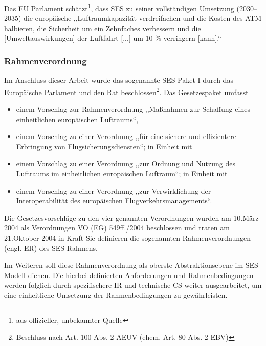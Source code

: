     \medskip
    Das \acs{EU} Parlament schätzt\footnote{aus offizieller, unbekannter Quelle}, dass \ac{SES} zu seiner vollständigen Umsetzung (2030--2035) die europäische ,,Luftraumkapazität verdreifachen und die Kosten des \ac{ATM} halbieren, die Sicherheit um ein Zehnfaches verbessern und die [Umweltauswirkungen] der Luftfahrt [...] um 10 \% verringern [kann].`` 
    \cite{eu_parl_ses} 


\subsubsection{Rahmenverordnung}

    Im Anschluss dieser Arbeit wurde das sogenannte \acs{SES}-Paket I durch das Europäische Parlament und den Rat beschlossen\footnote{Beschluss nach Art. 100 Abs. 2 AEUV (ehem. Art. 80 Abs. 2 EBV)}.
    Das Gesetzespaket umfasst 
    
    \begin{itemize}
        \item einem Vorschlag zur Rahmenverordnung ,,Maßnahmen zur Schaffung eines einheitlichen europäischen Luftraums``\cite{kom_01_564, kom_01_123},
        \item einem Vorschlag zu einer Verordnung ,,für eine sichere und effizientere Erbringung von Flugsicherungsdiensten``\cite{kom_01_564_1}; in Einheit mit
        \item  einem Vorschlag zu einer Verordnung ,,zur Ordnung und Nutzung des Luftraums im einheitlichen europäischen Luftraum``\cite{kom_01_564_2}; in Einheit mit
        \item  einem Vorschlag zu einer Verordnung ,,zur Verwirklichung der Interoperabilität des europäischen Flugverkehrsmanagements``\cite{kom_01_564_3}.
    \end{itemize}

    \medskip
    Die Gesetzesvorschläge zu den vier genannten Verordnungen wurden am 10.März 2004 als Verordnungen \acs{VO} (\acs{EG})  549ff./2004 beschlossen und traten am 21.Oktober 2004 in Kraft \cite[S.12]{eu_ses_studie}
    Sie definieren die sogenannten Rahmenverordnungen (engl. \acf{ER}) des \ac{SES} Rahmens.

    \medskip
    Im Weiteren soll diese Rahmenverordnung als oberste Abstraktionsebene im \ac{SES} Modell dienen. 
    Die hierbei definierten Anforderungen und Rahmenbedingungen werden folglich durch spezifischere \acf{IR} und technische \acf{CS} weiter ausgearbeitet, um eine einheitliche Umsetzung der Rahmenbedingungen zu gewährleisten.
    
    
